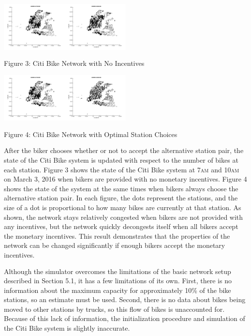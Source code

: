 \documentclass[times, 10pt,twocolumn]{article}
\begin{document}
\hfill \break
\centerline{\includegraphics[width=0.25\textwidth]{m2/no_incentives_before.png}\includegraphics[width=0.25\textwidth]{m2/no_incentives_after.png}}
\centerline{Figure 3: Citi Bike Network with No Incentives}
\hfill \break
\centerline{\includegraphics[width=0.25\textwidth]{m2/incentives_before.png}\includegraphics[width=0.25\textwidth]{m2/incentives_after.png}}
\centerline{Figure 4: Citi Bike Network with Optimal Station Choices}
\hfill \break
\indent After the biker chooses whether or not to accept the alternative station pair, the state of the Citi Bike system is updated with respect to the number of bikes at each station. Figure 3 shows the state of the Citi Bike system at 7\textsc{am} and 10\textsc{am} on March 3, 2016 when bikers are provided with no monetary incentives. Figure 4 shows the state of the system at the same times when bikers always choose the alternative station pair. In each figure, the dots represent the stations, and the size of a dot is proportional to how many bikes are currently at that station. As shown, the network stays relatively congested when bikers are not provided with any incentives, but the network quickly decongests itself when all bikers accept the monetary incentives. This result demonstrates that the properties of the network can be changed significantly if enough bikers accept the monetary incentives.

Although the simulator overcomes the limitations of the basic network setup described in Section 5.1, it has a few limitations of its own. First, there is no information about the maximum capacity for approximately 10\% of the bike stations, so an estimate must be used. Second, there is no data about bikes being moved to other stations by trucks, so this flow of bikes is unaccounted for. Because of this lack of information, the initialization procedure and simulation of the Citi Bike system is slightly inaccurate.
\end{document}
